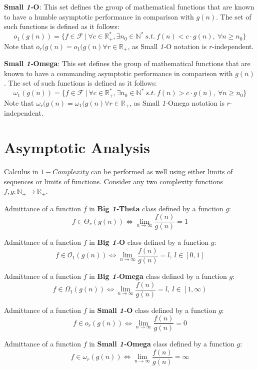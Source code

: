 \begin{definition}
    \textbf{Small \textit{1-}O}:
    This set defines the group of mathematical functions that are known to have a humble
    asymptotic performance in comparison with  $g(n)$. The set of such functions is defined as it follows:
    \[o_{1}(g(n)) = \lbrace f \in \mathcal{F}\ |\ \forall c \in \mathbb{R}^{*}_{+}, \exists n_{0} \in \mathbb{N}^{*}\ s.t.\  f(n) < c \cdot g(n),\  \forall n \geq n_{0} \rbrace\]
    Note that $o_{r}(g(n) = o_{1}(g(n) \forall r\in  \mathbb{R}_{+}$, as Small \textit{1-}O notation is $r$-independent.
\end{definition}
\begin{definition}
    \textbf{Small \textit{1-}Omega}:
    This set defines the group of mathematical functions that are known to have a commanding asymptotic performance in comparison with  $g(n)$.
    The set of such functions is defined as it follows:
    \[\omega_{1}(g(n)) = \lbrace f \in \mathcal{F}\ |\ \forall c \in \mathbb{R}^{*}_{+}, \exists n_{0} \in \mathbb{N}^{*}\ s.t.\  f(n) > c \cdot g(n),\  \forall n \geq n_{0} \rbrace\]
    Note that $\omega_{r}(g(n) = \omega_{1}(g(n) \forall r\in  \mathbb{R}_{+}$, as Small \textit{1-}Omega notation is $r$-independent.
\end{definition}


\section{Asymptotic Analysis}
Calculus in $1-Complexity$ can be performed as well using either limits of sequences or limits of functions. Consider any two complexity functions $f,g:\mathbb{N}_{+}\longrightarrow\mathbb{R}_{+}$.

\begin{theorem}
    Admittance of a function $f$ in \textbf{Big \textit{1-}Theta} class defined by a function $g$:
    \[ f \in \Theta_{r}(g(n)) \Leftrightarrow \lim_{n\to\infty} \dfrac{f(n)}{g(n)} = 1 \]
\end{theorem}
\begin{theorem}
    Admittance of a function $f$ in \textbf{Big \textit{1-}O} class defined by a function $g$:
    \[ f \in \mathcal{O}_{1}(g(n)) \Leftrightarrow \lim_{n\to\infty} \dfrac{f(n)}{g(n)} = l,\ l \in \left[ 0, 1 \right] \]
\end{theorem}
\begin{theorem}
    Admittance of a function $f$ in \textbf{Big \textit{1-}Omega} class defined by a function $g$:
    \[ f \in \Omega_{1}(g(n)) \Leftrightarrow \lim_{n\to\infty} \dfrac{f(n)}{g(n)} = l,\ l \in \left[ 1, \infty \right) \]
\end{theorem}
\begin{theorem}
    Admittance of a function $f$ in \textbf{Small \textit{1-}O} class defined by a function $g$:
    \[ f \in o_{r}(g(n)) \Leftrightarrow \lim_{n\to\infty} \dfrac{f(n)}{g(n)} = 0 \]
\end{theorem}
\begin{theorem}
    Admittance of a function $f$ in \textbf{Small \textit{1-}Omega} class defined by a function $g$:
    \[ f \in \omega_{r}(g(n)) \Leftrightarrow \lim_{n\to\infty} \dfrac{f(n)}{g(n)} = \infty \]
\end{theorem}



